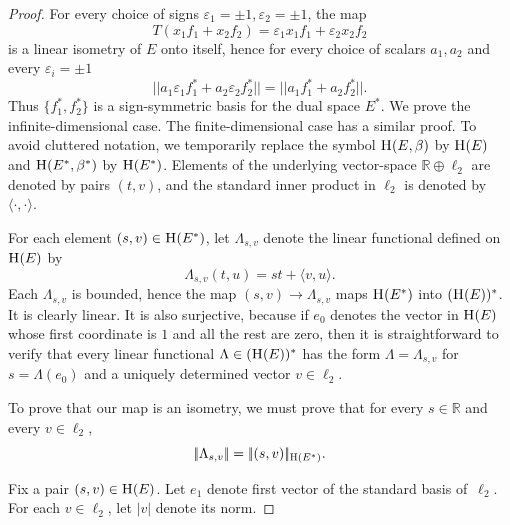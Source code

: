 \documentclass{article}[1100]
\theoremstyle{definition}
\theoremstyle{remark}
\newcommand\eps{\varepsilon}
\newcommand\innerproduct[2]{\langle #1,#2\rangle}
\newcommand\ar{\mathbb{R}}
\newcommand\norma[1]{|\!|#1|\!|}
\newcommand\mySpaceH[1]{\textsc{H}(#1)}
\begin{document}
\begin{proof}
For every choice of signs $\eps_1=\pm 1,\eps_2=\pm 1$, the map 
\[ T(x_1f_1+x_2f_2)=\eps_1x_1f_1+\eps_2x_2f_2 \]
is a linear isometry of $E$ onto itself, hence for every choice of scalars $a_1,a_2$ and every $\eps_i=\pm 1$
\[
\norma{a_1\eps_1f_1^*+a_2\eps_2f_2^*}=\norma{a_1f_1^*+a_2 f_2^*}.
\]
Thus $\{f_1^*,f_2^*\}$ is a sign-symmetric basis for the dual space $E^*$.
\vskip 6pt
We prove the infinite-dimensional case. The finite-dimensional case has a similar proof. To avoid
cluttered notation, we  temporarily replace the symbol $\mySpaceH{E,\beta}$ by $\mySpaceH{E}$ and $\mySpaceH{E^*,\beta^*}$ by $\mySpaceH{E^*}$.  Elements of the underlying vector-space $\ar\oplus\ell_2$ are denoted by pairs $(t,v)$, and the standard inner product in $\ell_2$ is denoted by $\langle\cdot,\cdot\rangle$.

\medskip
 
  For each element $(s,v)\in\mySpaceH{E^*}$, let $\Lambda_{s,v}$ denote the linear functional defined on $\mySpaceH{E}$ by
\[ \Lambda_{s,v}(t,u)=st+\innerproduct{v}{u}.\]
 Each $\Lambda_{s,v}$ is bounded, hence the map $(s,v)\to\Lambda_{s,v}$ maps
$\mySpaceH{E^*}$ into $(\mySpaceH{E})^*$. It is clearly linear. It is also surjective, because if $e_0$ denotes the vector in $\mySpaceH{E}$ whose first coordinate is $1$ and all the rest are zero, then it is straightforward to verify that every linear functional $\Lambda\in(\mySpaceH{E})^*$ has the form $\Lambda=\Lambda_{s,v}$ for $s=\Lambda(e_0)$ and a uniquely determined vector $v\in\ell_2$.

\medskip

To prove that our map is an isometry, we must  prove that for every $s\in\ar$ and every $v\in\ell_2$,
\begin{equation}\label{isometryToProve}
\norma{\Lambda_{s,v}}=\norma{(s,v)}_{\mySpaceH{E^*}} .
\end{equation}

\medskip

Fix a pair $(s,v)\in\mySpaceH{E}$. Let $e_1$ denote first vector  of the standard basis of~$\ell_2$. For each $v\in\ell_2$,  let $|v|$ denote its norm. 

\medskip


\end{proof}
\end{document}
